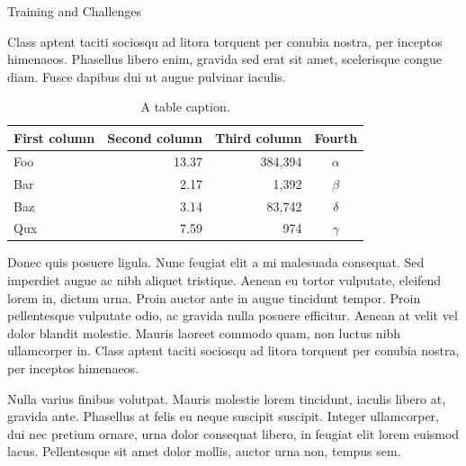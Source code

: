 \documentclass[final]{beamer}
\newlength{\colwidth}
\newlength{\rightwide}
\begin{document}
\begin{frame}[t]
\begin{columns}[t]
\begin{column}{\rightwide}
\begin{columns}[t,totalwidth=\rightwide]
\begin{column}{\colwidth}



  \begin{block}{Training and Challenges}

    Class aptent taciti sociosqu ad litora torquent per conubia nostra, per
    inceptos himenaeos. Phasellus libero enim, gravida sed erat sit amet,
    scelerisque congue diam. Fusce dapibus dui ut augue pulvinar iaculis.

    \begin{table}
      \centering
      \begin{tabular}{l r r c}
        \toprule
        \textbf{First column} & \textbf{Second column} & \textbf{Third column} & \textbf{Fourth} \\
        \midrule
        Foo & 13.37 & 384,394 & $\alpha$ \\
        Bar & 2.17 & 1,392 & $\beta$ \\
        Baz & 3.14 & 83,742 & $\delta$ \\
        Qux & 7.59 & 974 & $\gamma$ \\
        \bottomrule
      \end{tabular}
      \caption{A table caption.}
    \end{table}

    Donec quis posuere ligula. Nunc feugiat elit a mi malesuada consequat. Sed
    imperdiet augue ac nibh aliquet tristique. Aenean eu tortor vulputate,
    eleifend lorem in, dictum urna. Proin auctor ante in augue tincidunt
    tempor. Proin pellentesque vulputate odio, ac gravida nulla posuere
    efficitur. Aenean at velit vel dolor blandit molestie. Mauris laoreet
    commodo quam, non luctus nibh ullamcorper in. Class aptent taciti sociosqu
    ad litora torquent per conubia nostra, per inceptos himenaeos.

    Nulla varius finibus volutpat. Mauris molestie lorem tincidunt, iaculis
    libero at, gravida ante. Phasellus at felis eu neque suscipit suscipit.
    Integer ullamcorper, dui nec pretium ornare, urna dolor consequat libero,
    in feugiat elit lorem euismod lacus. Pellentesque sit amet dolor mollis,
    auctor urna non, tempus sem.


\end{block}
\end{column}
\end{columns}
\end{column}
\end{columns}
\end{frame}
\end{document}
